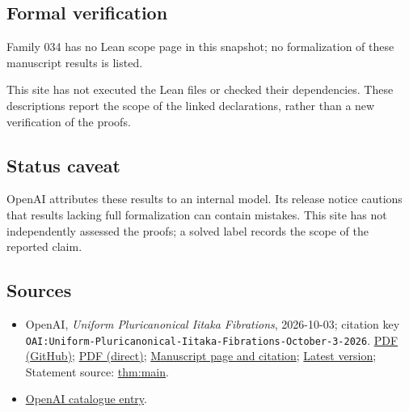 \documentclass[11pt]{article}
\begin{document}
\subsection{Formal verification}
Family 034 has no Lean scope page in this snapshot; no formalization of these manuscript results is listed.

This site has not executed the Lean files or checked their dependencies. These descriptions report the scope of the linked declarations, rather than a new verification of the proofs.

\subsection{Status caveat}
OpenAI attributes these results to an internal model. Its release notice cautions that results lacking full formalization can contain mistakes. This site has not independently assessed the proofs; a solved label records the scope of the reported claim.

\subsection{Sources}
\begin{itemize}
\item OpenAI, \emph{Uniform Pluricanonical Iitaka Fibrations}, 2026-10-03; citation key \texttt{OAI:Uniform-Pluricanonical-Iitaka-Fibrations-October-3-2026}. \href{https://github.com/openai/math/blob/adc7f1241b42e322a6451854ab7e4b4c146bf78a/preprints/Uniform-Pluricanonical-Iitaka-Fibrations-October-3-2026/paper.pdf}{PDF (GitHub)}; \href{https://github.com/openai/math/raw/adc7f1241b42e322a6451854ab7e4b4c146bf78a/preprints/Uniform-Pluricanonical-Iitaka-Fibrations-October-3-2026/paper.pdf}{PDF (direct)}; \href{https://github.com/openai/math/blob/adc7f1241b42e322a6451854ab7e4b4c146bf78a/preprints/Uniform-Pluricanonical-Iitaka-Fibrations-October-3-2026/README.md}{Manuscript page and citation}; \href{https://github.com/openai/math/blob/main/preprints/Uniform-Pluricanonical-Iitaka-Fibrations-October-3-2026/paper.pdf}{Latest version}; Statement source: \href{https://github.com/openai/math/blob/adc7f1241b42e322a6451854ab7e4b4c146bf78a/preprints/Uniform-Pluricanonical-Iitaka-Fibrations-October-3-2026/build/sections/introduction.tex\#L19}{thm:main}.
\item \href{https://github.com/openai/math/blob/adc7f1241b42e322a6451854ab7e4b4c146bf78a/CONTENTS.md}{OpenAI catalogue entry}.
\end{itemize}
\end{document}
